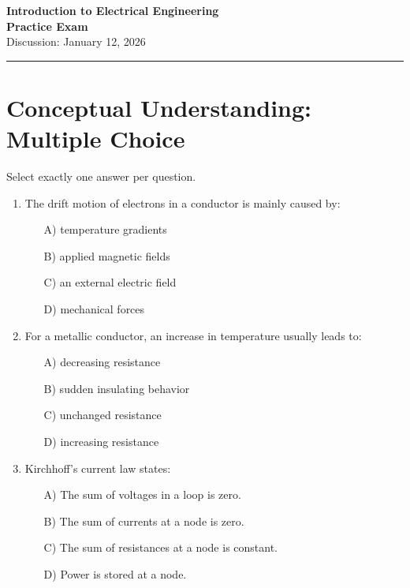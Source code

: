 \documentclass[a4paper,12pt]{article}
\newif\ifshowsolutions
\begin{document}
\begin{center}
  {\LARGE\bfseries Introduction to Electrical Engineering \\[6pt] Practice Exam}\\[12pt]
  {\large Discussion: January 12, 2026}\\[6pt]
  \rule{\textwidth}{0.4pt}
\end{center}

\section{Conceptual Understanding: Multiple Choice}

Select exactly one answer per question.

\vspace{8pt}

\begin{enumerate}[label=\textbf{\arabic*.}, leftmargin=*, itemsep=8pt]

  \item The drift motion of electrons in a conductor is mainly caused by:
    \begin{itemize}[label=$\square$]
      \item[A)] temperature gradients
      \item[B)] applied magnetic fields
      \item[C)] an external electric field
      \item[D)] mechanical forces
    \end{itemize}

\ifshowsolutions
Solution: C
\fi

  \item For a metallic conductor, an increase in temperature usually leads to:
    \begin{itemize}[label=$\square$]
      \item[A)] decreasing resistance
      \item[B)] sudden insulating behavior
      \item[C)] unchanged resistance
      \item[D)] increasing resistance
    \end{itemize}

\ifshowsolutions
Solution: D
\fi

  \item Kirchhoff’s current law states:
    \begin{itemize}[label=$\square$]
      \item[A)] The sum of voltages in a loop is zero.
      \item[B)] The sum of currents at a node is zero.
      \item[C)] The sum of resistances at a node is constant.
      \item[D)] Power is stored at a node.
    \end{itemize}


\end{enumerate}
\end{document}
